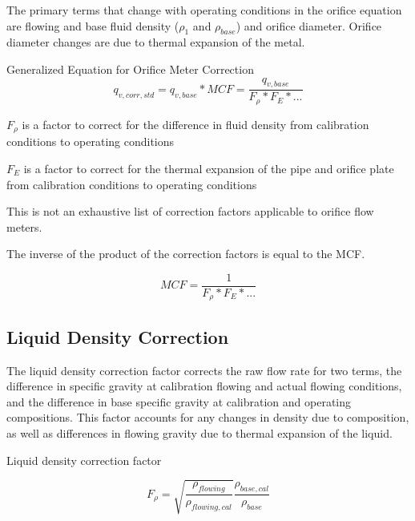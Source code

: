 \documentclass{article}
\begin{document}
The primary terms that change with operating conditions in the orifice equation are flowing and base fluid density ($\rho_1$ and $\rho_{base}$) and orifice diameter. Orifice diameter changes are due to thermal expansion of the metal.

\begin{proposition}Generalized Equation for Orifice Meter Correction
\begin{equation}
    q_{v, corr, std} = q_{v, base} * MCF = \frac{q_{v, base}}{F_{\rho} * F_{E} * ...} 
\end{equation}
    \begin{description}
        \item $F_{\rho}$ is a factor to correct for the difference in fluid density from calibration conditions to operating conditions
        \item $F_{E}$ is a factor to correct for the thermal expansion of the pipe and orifice plate from calibration conditions to operating conditions
        \item This is not an exhaustive list of correction factors applicable to orifice flow meters.
        \item The inverse of the product of the correction factors is equal to the MCF.
    \end{description}
    \begin{equation}
        MCF = \frac{1}{F_{\rho} * F_{E} * ...}
    \end{equation}
\end{proposition}

\subsection{Liquid Density Correction}

The liquid density correction factor corrects the raw flow rate for two terms, the difference in specific gravity at calibration flowing and actual flowing conditions, and the difference in base specific gravity at calibration and operating compositions. This factor accounts for any changes in density due to composition, as well as differences in flowing gravity due to thermal expansion of the liquid.

\begin{proposition} Liquid density correction factor
    
\begin{equation}
    F_{\rho} = \sqrt{\frac{\rho_{flowing}}{\rho_{flowing, cal}}}\frac{\rho_{base, cal}}{\rho_{base}}
\end{equation}
\end{proposition}
\end{document}
